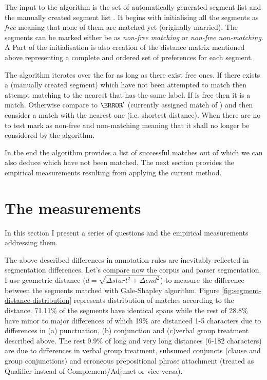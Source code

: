 The input to the algorithm is the set of automatically generated segment list \aslist and the manually created segment list \mslist.  It begins with initialising all the segments as \textit{free} meaning that none of them are matched yet (originally married). The segments can be marked either be as \textit{non-free matching} or \textit{non-free non-matching}. A Part of the initialisation is also creation of the distance matrix mentioned above representing a complete and ordered set of preferences for each segment. 

The algorithm iterates over the \aslist for as long as there exist free ones. If there exists a \ms (manually created segment) which have not been attempted to match \as then attempt matching \as to the nearest \ms that has the same label. If \ms is free then it is a match. Otherwise compare \as to $\as'$ (currently assigned match of \ms) and then consider a match with the nearest one (i.e. shortest distance). When there are no \mslist to test mark \as as non-free and non-matching meaning that it shall no longer be considered by the algorithm.

In the end the algorithm provides a list of successful matches out of which we can also deduce which \aslist \mslist have not been matched. The next section provides the empirical measurements resulting from applying the current method. 

\section{The measurements}
\label{sec:results}

In this section I present a series of questions and the empirical measurements addressing them. 

The above described differences in annotation rules are inevitably reflected in segmentation differences. Let's compare now the corpus and parser segmentation. I use geometric distance ($ d= \sqrt{\varDelta start ^{2}+\varDelta end ^{2}} $) to measure the difference between the segments matched with Gale-Shapley algorithm. Figure \ref{fig:segment-distance-distribution} represents distribution of matches according to the distance. 71.11\% of the segments have identical spans while the rest of 28.8\% have minor to major differences of which 19\% are distanced 1-5 characters due to differences in (a) punctuation, (b) conjunction and (c)verbal group treatment described above. The rest 9.9\% of long and very long distances (6-182 characters) are due to differences in verbal group treatment, subsumed conjuncts (clause and group conjunctions) and erroneous prepositional phrase attachment (treated as Qualifier instead of Complement/Adjunct or vice versa).

